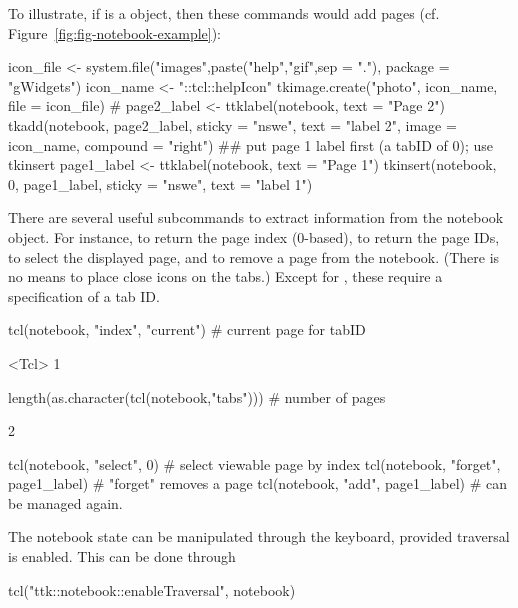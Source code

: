 To illustrate, if  is a  object, then these
commands would add pages (cf. Figure~\ref{fig:fig-notebook-example}):
\begin{Schunk}
\begin{Sinput}
 icon_file <- system.file("images",paste("help","gif",sep = "."),
                         package = "gWidgets")
 icon_name <- "::tcl::helpIcon"
 tkimage.create("photo", icon_name, file = icon_file)
 #
 page2_label <- ttklabel(notebook, text = "Page 2")
 tkadd(notebook, page2_label, sticky = "nswe", text = "label 2", 
     image = icon_name, compound = "right")
 ## put page 1 label first (a tabID of 0); use tkinsert
 page1_label <- ttklabel(notebook, text = "Page 1")
 tkinsert(notebook, 0, page1_label, sticky = "nswe", text = "label 1")
\end{Sinput}
\end{Schunk}
%
There are several useful subcommands to extract information from the
notebook object.  For instance,  to return the page index
(0-based),  to return the page IDs,  to select
the displayed page, and  to remove a page from the
notebook. (There is no means to place close icons on the tabs.)
Except for , these require a specification of a tab ID.
\begin{Schunk}
\begin{Sinput}
 tcl(notebook, "index", "current")           # current page for tabID
\end{Sinput}
\begin{Soutput}
<Tcl> 1 
\end{Soutput}
\begin{Sinput}
 length(as.character(tcl(notebook,"tabs")))  # number of pages
\end{Sinput}
\begin{Soutput}
[1] 2
\end{Soutput}
\begin{Sinput}
 tcl(notebook, "select", 0)        # select viewable page by index
 tcl(notebook, "forget", page1_label)       # "forget" removes a page
 tcl(notebook, "add", page1_label)          # can be managed again.
\end{Sinput}
\end{Schunk}
%

The notebook state can be manipulated through the keyboard, provided traversal is enabled. This can be done through
\begin{Schunk}
\begin{Sinput}
 tcl("ttk::notebook::enableTraversal", notebook)
\end{Sinput}
\end{Schunk}

